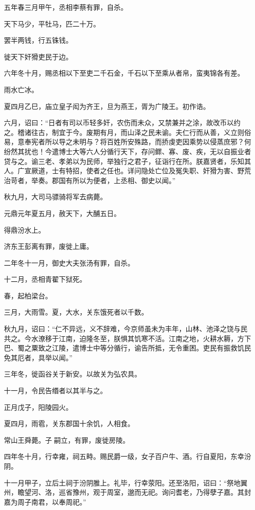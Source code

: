\documentclass[]{article}
\begin{document}
五年春三月甲午，丞相李蔡有罪，自杀。

天下马少，平牡马，匹二十万。

罢半两钱，行五铢钱。

徙天下奸猾吏民于边。

六年冬十月，赐丞相以下至吏二千石金，千石以下至乘从者帛，蛮夷锦各有差。

雨水亡冰。

夏四月乙巳，庙立皇子闳为齐王，旦为燕王，胥为广陵王。初作诰。

六月，诏曰：``日者有司以币轻多奸，农伤而未众，又禁兼并之涂，故改币以约之。稽诸往古，制宜于今。废期有月，而山泽之民未谕。夫仁行而从善，义立则俗易，意奉宪者所以导之未明与？将百姓所安殊路，而挢虔吏因乘势以侵蒸庶邪？何纷然其扰也！今遣博士大等六人分循行天下，存问鳏、寡、废、疾，无以自振业者贷与之。谕三老、孝弟以为民师，举独行之君子，征诣行在所。朕嘉贤者，乐知其人。广宣厥道，士有特招，使者之任也。详问隐处亡位及冤失职、奸猾为害、野荒治苛者，举奏。郡国有所以为便者，上丞相、御史以闻。''

秋九月，大司马骠骑将军去病薨。

元鼎元年夏五月，赦天下，大酺五日。

得鼎汾水上。

济东王彭离有罪，废徙上庸。

二年冬十一月，御史大夫张汤有罪，自杀。

十二月，丞相青翟下狱死。

春，起柏梁台。

三月，大雨雪。夏，大水，关东饿死者以千数。

秋九月，诏曰：``仁不异远，义不辞难，今京师虽未为丰年，山林、池泽之饶与民共之。今水潦移于江南，迫隆冬至，朕惧其饥寒不活。江南之地，火耕水耨，方下巴、蜀之粟致之江陵，遣博士中等分循行，谕告所抵，无令重困。吏民有振救饥民免其厄者，具举以闻。''

三年冬，徙函谷关于新安。以故关为弘农具。

十一月，令民告缗者以其半与之。

正月戊子，阳陵园火。

夏四月，雨雹，关东郡国十余饥，人相食。

常山王舜薨。子嗣立，有罪，废徙房陵。

四年冬十月，行幸雍，祠五畤。赐民爵一级，女子百户牛、酒。行自夏阳，东幸汾阴。

十一月甲子，立后土祠于汾阴脽上。礼毕，行幸荥阳。还至洛阳，诏曰：``祭地翼州，瞻望河、洛，巡省豫州，观于周室，邈而无祀。询问耆老，乃得孽子嘉。其封嘉为周子南君，以奉周祀。''
\end{document}
